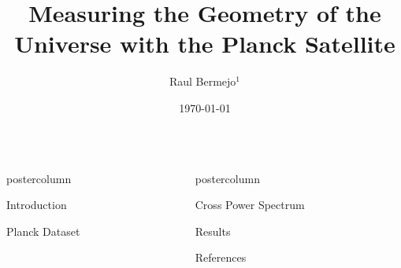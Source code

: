 \documentclass{beamer}
\title{\huge Measuring the Geometry of the Universe with the Planck Satellite}
\author{Raul Bermejo$^{1}$}
\institute[UniMelb]{$^{1}$School of Physics, University of Melbourne}
\date{\today}
\newlength{\columnheight}
\begin{document}
\begin{frame}
\begin{columns}
	\begin{column}{.54\textwidth}
		\begin{beamercolorbox}[center]{postercolumn}
			\begin{minipage}{.98\textwidth}  %
				\parbox[t][\columnheight]{\textwidth}{ %
					\begin{myblock}{Introduction}	
				
						
					\end{myblock}\vfill
					
					
					\begin{myblock}{Planck Dataset}
					
					\end{myblock}\vfill
		}\end{minipage}\end{beamercolorbox}
	\end{column}
	
	
	\begin{column}{.46\textwidth}
		\begin{beamercolorbox}[center]{postercolumn}
			\begin{minipage}{.98\textwidth} %
				\parbox[t][\columnheight]{\textwidth}{ %
					\begin{myblock}{Cross Power Spectrum}
					
					
					\end{myblock}\vfill
					
					
					\begin{myblock}{Results}
					
					\end{myblock}\vfill
					
					
					
					\begin{myblock}{References}
						\footnotesize
						
						
					\end{myblock}\vfill
		}\end{minipage}\end{beamercolorbox}
	\end{column}
\end{columns}
\end{frame}
\end{document}
